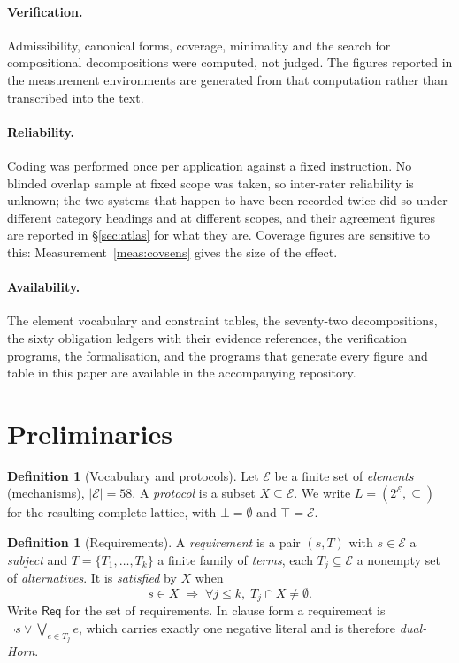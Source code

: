 \documentclass[11pt,reqno]{amsart}
\theoremstyle{plain}
\theoremstyle{definition}
\newtheorem{definition}[theorem]{Definition}
\theoremstyle{remark}
\newcommand{\El}{\mathcal{E}}
\newcommand{\Law}{\mathsf{Req}}
\begin{document}
\paragraph{Verification.} Admissibility, canonical forms, coverage, minimality
and the search for compositional decompositions were computed, not judged. The
figures reported in the measurement environments are generated from that
computation rather than transcribed into the text.

\paragraph{Reliability.} Coding was performed once per application against a
fixed instruction. No blinded overlap sample at fixed scope was taken, so
inter-rater reliability is unknown; the two systems that happen to have been
recorded twice did so under different category headings and at different scopes,
and their agreement figures are reported in \S\ref{sec:atlas} for what they are.
Coverage figures are sensitive to this: Measurement~\ref{meas:covsens} gives the
size of the effect.

\paragraph{Availability.} The element vocabulary and constraint tables, the
seventy-two decompositions, the sixty obligation ledgers with their evidence
references, the verification programs, the formalisation, and the programs that
generate every figure and table in this paper are available in the
accompanying repository.

\section{Preliminaries}

\begin{definition}[Vocabulary and protocols]
Let $\El$ be a finite set of \emph{elements} (mechanisms), $|\El| = 58$. A
\emph{protocol} is a subset $X \subseteq \El$. We write
$L = (2^{\El}, \subseteq)$ for the resulting complete lattice, with
$\bot = \emptyset$ and $\top = \El$.
\end{definition}

\begin{definition}[Requirements]
A \emph{requirement} is a pair $(s, T)$ with $s \in \El$ a \emph{subject} and
$T = \{T_1,\dots,T_k\}$ a finite family of \emph{terms}, each $T_j \subseteq \El$
a nonempty set of \emph{alternatives}. It is \emph{satisfied} by $X$ when
\[
  s \in X \;\Longrightarrow\; \forall j \le k,\; T_j \cap X \neq \emptyset .
\]
Write $\Law$ for the set of requirements. In clause form a requirement is
$\neg s \vee \bigvee_{e \in T_j} e$, which carries exactly one negative literal
and is therefore \emph{dual-Horn}.
\end{definition}
\end{document}

